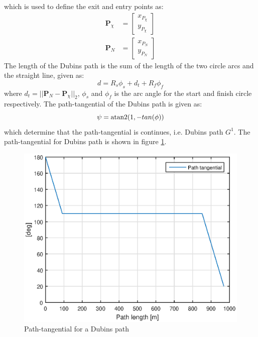 which is used to define the exit and entry points as:
\begin{subequations}
\begin{align}
\mathbf{P}_{\chi} &= \begin{bmatrix}
x_{P_\chi} \\
y_{P_\chi}
\end{bmatrix} \\
\mathbf{P}_N &= \begin{bmatrix}
x_{P_N} \\
y_{P_N}
\end{bmatrix}
\end{align}
\end{subequations}
The length of the Dubins path is the sum of the length of the two circle arcs and the straight line, given as:
\begin{equation}
d = R_s\phi_s + d_t + R_f\phi_f
\end{equation}
where $d_t = ||\mathbf{P}_N-\mathbf{P}_{\chi}||_2$, $\phi_s$ and $\phi_f$ is the arc angle for the start and finish circle respectively. The path-tangential of the Dubins path is given as:
\begin{equation}
\psi = \atan2(1,-tan(\phi))
\end{equation}
which determine that the path-tangential is continues, i.e. Dubins path $G^1$. The path-tangential for Dubins path is shown in figure \ref{Fig:Path-tangentialDubin}.
\begin{figure}[H]
\centering
\includegraphics[scale=0.7]{figs/TheoryPlot/tangentialDubin.eps}
\caption{Path-tangential for a Dubins path}
\label{Fig:Path-tangentialDubin}
\end{figure}
\cleardoublepage